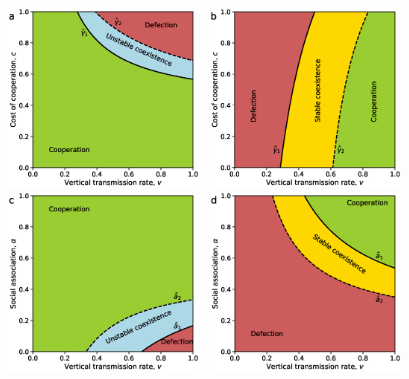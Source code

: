 \documentclass[12pt]{extarticle}
\begin{document}
{%

\begin{figure}[htb]
  \centering       
    \includegraphics[width=0.45\textwidth]{Result3_TA_TB.eps}~
    \includegraphics[width=0.45\textwidth]{Result3_TB_TA.eps}
    \includegraphics[width=0.45\textwidth]{Result3_alpha_Vs_v_TA_TB.eps}~
    \includegraphics[width=0.45\textwidth]{Result3_alpha_Vs_v_TB_TA.eps}

\end{figure}}
\end{document}
